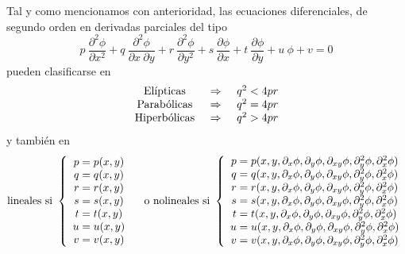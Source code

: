 \documentclass[spanish,titlepage,11pt]{article}
\begin{document}
Tal y como mencionamos con anterioridad, las ecuaciones diferenciales, de
segundo orden en derivadas parciales del tipo
\[
p\ \frac{\partial^{2}\phi}{\partial x^{2}}+q\ \frac{\partial^{2}\phi}{\partial
x\ \partial y}+r\ \frac{\partial^{2}\phi}{\partial y^{2}}+s\ \frac
{\partial\phi}{\partial x}+t\ \frac{\partial\phi}{\partial y}+u\ \phi+v=0
\]
pueden clasificarse en
\[
\left.
\begin{array}
[c]{c}%
\text{El\'{\i}pticas}\\
\text{Parab\'{o}licas}\\
\text{Hiperb\'{o}licas}%
\end{array}
\right.  \left.
\begin{array}
[c]{c}%
\Rightarrow\\
\Rightarrow\\
\Rightarrow
\end{array}
\right.  \left.
\begin{array}
[c]{c}%
q^{2}<4pr\\
q^{2}=4pr\\
q^{2}>4pr
\end{array}
\right.
\]
y tambi\'{e}n en
\[
\mathrm{lineales\ si\ }\left\{
\begin{array}
[c]{c}%
p=p(x,y)\\
q=q(x,y)\\
r=r(x,y)\\
s=s(x,y)\\
t=t(x,y)\\
u=u(x,y)\\
v=v(x,y)
\end{array}
\right.  \mathrm{\quad o\ nolineales\ si\ }\left\{
\begin{array}
[c]{c}%
p=p(x,y,\partial_{x}\phi,\partial_{y}\phi,\partial_{xy}\phi,\partial_{y}%
^{2}\phi,\partial_{x}^{2}\phi)\\
q=q(x,y,\partial_{x}\phi,\partial_{y}\phi,\partial_{xy}\phi,\partial_{y}%
^{2}\phi,\partial_{x}^{2}\phi)\\
r=r(x,y,\partial_{x}\phi,\partial_{y}\phi,\partial_{xy}\phi,\partial_{y}%
^{2}\phi,\partial_{x}^{2}\phi)\\
s=s(x,y,\partial_{x}\phi,\partial_{y}\phi,\partial_{xy}\phi,\partial_{y}%
^{2}\phi,\partial_{x}^{2}\phi)\\
t=t(x,y,\partial_{x}\phi,\partial_{y}\phi,\partial_{xy}\phi,\partial_{y}%
^{2}\phi,\partial_{x}^{2}\phi)\\
u=u(x,y,\partial_{x}\phi,\partial_{y}\phi,\partial_{xy}\phi,\partial_{y}%
^{2}\phi,\partial_{x}^{2}\phi)\\
v=v(x,y,\partial_{x}\phi,\partial_{y}\phi,\partial_{xy}\phi,\partial_{y}%
^{2}\phi,\partial_{x}^{2}\phi)
\end{array}
\right.
\]
\end{document}
